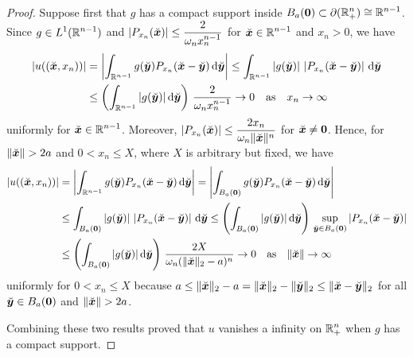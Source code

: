\begin{proof}
 Suppose first that $g$ has a compact support inside
$\displaystyle B_a({\bm{0}}) \subset \partial(\mathbb{R}^n_+) \cong \mathbb{R}^{n-1}$.  Since
$\displaystyle g \in L^1(\mathbb{R}^{n-1})$ and
$\displaystyle \left| P_{x_n}(\breve{{\bm{x}}})\right| \leq 
\frac{2}{\omega_{n} x_n^{n-1}}$
for $\displaystyle \breve{{\bm{x}}} \in \mathbb{R}^{n-1}$ and $x_n >0$, we have
\begin{align*}
| u((\breve{{\bm{x}}},x_n)) | &= \left| \int_{\mathbb{R}^{n-1}} g(\breve{{\bm{y}}})
P_{x_n}(\breve{{\bm{x}}} - \breve{{\bm{y}}}) \,\mathrm{d}{\breve{{\bm{y}}}} \right|
\leq \int_{\mathbb{R}^{n-1}} | g(\breve{{\bm{y}}})| \,
\left| P_{x_n}(\breve{{\bm{x}}} - \breve{{\bm{y}}}) \right|
\,\mathrm{d}{\breve{{\bm{y}}}} \\
& \leq \left( \int_{\mathbb{R}^{n-1}} | g(\breve{{\bm{y}}})|
\,\mathrm{d}{\breve{{\bm{y}}}} \right)\, \frac{2}{\omega_{n} x_n^{n-1}} \to 0 \quad
\text{as} \quad x_n \to \infty
\end{align*}
uniformly for $\displaystyle \breve{{\bm{x}}} \in \mathbb{R}^{n-1}$.  Moreover,
$\displaystyle \left| P_{x_n}(\breve{{\bm{x}}})\right| \leq
\frac{2 x_n}{\omega_{n} \|\breve{{\bm{x}}}\|^n}$ for
$\breve{{\bm{x}}} \neq {\bm{0}}$.
Hence, for $\|\breve{{\bm{x}}}\| > 2a$ and $0< x_n \leq X$, where $X$
is arbitrary but fixed, we have
\begin{align*}
| u((\breve{{\bm{x}}},x_n)) | &= \left| \int_{\mathbb{R}^{n-1}} g(\breve{{\bm{y}}})
P_{x_n}(\breve{{\bm{x}}} - \breve{{\bm{y}}}) \,\mathrm{d}{\breve{{\bm{y}}}} \right|
= \left| \int_{B_a({\bm{0}})} g(\breve{{\bm{y}}})
P_{x_n}(\breve{{\bm{x}}} - \breve{{\bm{y}}}) \,\mathrm{d}{\breve{{\bm{y}}}}
\right| \\
& \leq \int_{B_a({\bm{0}})} | g(\breve{{\bm{y}}})| \,
\left| P_{x_n}(\breve{{\bm{x}}} - \breve{{\bm{y}}}) \right|
\,\mathrm{d}{\breve{{\bm{y}}}}
\leq \left( \int_{B_a({\bm{0}})} | g(\breve{{\bm{y}}})|\,\mathrm{d}{\breve{{\bm{y}}}}
\right)\,
\sup_{\breve{{\bm{y}}} \in B_a({\bm{0}})}
\left| P_{x_n}(\breve{{\bm{x}}} - \breve{{\bm{y}}}) \right| \\
& \leq \left( \int_{B_a({\bm{0}})} | g(\breve{{\bm{y}}})|\,\mathrm{d}{\breve{{\bm{y}}}}
\right)\,
\frac{2 X}{\omega_{n} (\|\breve{{\bm{x}}}\|_2 - a)^n} \to 0 \quad \text{as}
\quad \|\breve{{\bm{x}}}\| \to \infty
\end{align*}
uniformly for $0 < x_n \leq X$ because
$a \leq \|\breve{{\bm{x}}}\|_2 - a
= \|\breve{{\bm{x}}}\|_2 - \|\breve{{\bm{y}}}\|_2
\leq \|\breve{{\bm{x}}} - \breve{{\bm{y}}}\|_2$ for all
$\breve{{\bm{y}}} \in B_a({\bm{0}})$ and
$\|\breve{{\bm{x}}}\| > 2a$.

Combining these two results proved that $u$ vanishes a infinity on
$\displaystyle \mathbb{R}^n_+$ when $g$ has a compact support.


\end{proof}
